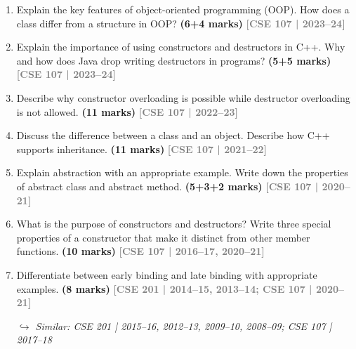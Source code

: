 \documentclass[12pt,a3paper]{article}
\newcommand{\yr}[1]{\hfill\textcolor{gray}{\small\textbf{[#1]}}}
\newcommand{\mk}[1]{\textcolor{orange!70!black}{\small\textbf{(#1 marks)}}}
\newcommand{\variant}[1]{\par\vspace{1pt}\textcolor{blue!50!black}%
  {\footnotesize\textit{$\hookrightarrow$ Similar: #1}}}
\begin{document}
\begin{enumerate}
\item Explain the key features of object-oriented programming (OOP). How does a class differ from a structure in OOP? \mk{6+4}
\yr{CSE 107 | 2023--24}




\item Explain the importance of using constructors and destructors in C++. Why and how does Java drop writing destructors in programs? \mk{5+5}
\yr{CSE 107 | 2023--24}




\item Describe why constructor overloading is possible while destructor overloading is not allowed. \mk{11}
\yr{CSE 107 | 2022--23}




\item Discuss the difference between a class and an object. Describe how C++ supports inheritance. \mk{11}
\yr{CSE 107 | 2021--22}




\item Explain abstraction with an appropriate example. Write down the properties of abstract class and abstract method. \mk{5+3+2}
\yr{CSE 107 | 2020--21}




\item What is the purpose of constructors and destructors? Write three special properties of a constructor that make it distinct from other member functions. \mk{10}
\yr{CSE 107 | 2016--17, 2020--21}




\item Differentiate between early binding and late binding with appropriate examples. \mk{8}
\yr{CSE 201 | 2014--15, 2013--14; CSE 107 | 2020--21}
\variant{CSE 201 | 2015--16, 2012--13, 2009--10, 2008--09; CSE 107 | 2017--18}


\end{enumerate}
\end{document}

